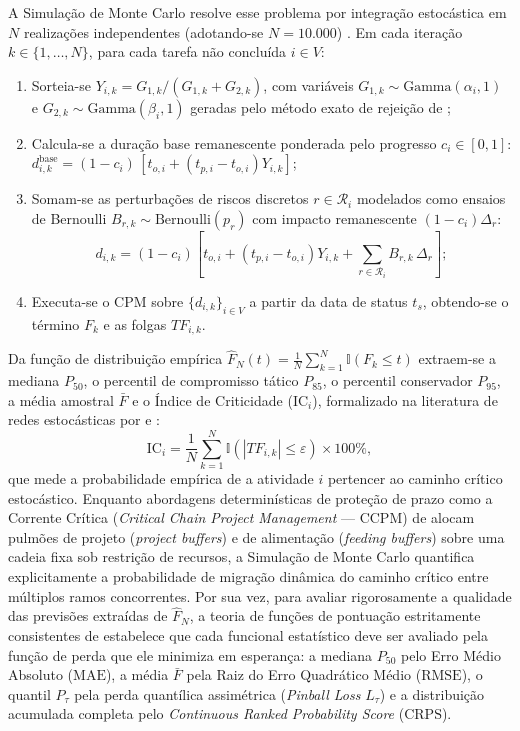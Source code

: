 \documentclass[12pt,openany,oneside,a4paper,english,brazilian,sumario=tradicional]{abntex2}
\newcommand{\IC}{\mathrm{IC}}
\begin{document}
A Simulação de Monte Carlo resolve esse problema por integração estocástica em $N$ realizações independentes (adotando-se $N=10.000$) \cite{vanslyke1963,law2015}. Em cada iteração $k \in \{1,\dots,N\}$, para cada tarefa não concluída $i \in V$:
\begin{enumerate}
  \item Sorteia-se $Y_{i,k} = G_{1,k}/(G_{1,k}+G_{2,k})$, com variáveis $G_{1,k}\sim\mathrm{Gamma}(\alpha_i,1)$ e $G_{2,k}\sim\mathrm{Gamma}(\beta_i,1)$ geradas pelo método exato de rejeição de ;
  \item Calcula-se a duração base remanescente ponderada pelo progresso $c_i \in [0,1]$: $d_{i,k}^{\mathrm{base}} = (1-c_i)\,[t_{o,i} + (t_{p,i}-t_{o,i})Y_{i,k}]$;
  \item Somam-se as perturbações de riscos discretos $r \in \mathcal{R}_i$ modelados como ensaios de Bernoulli $B_{r,k}\sim\mathrm{Bernoulli}(p_r)$ com impacto remanescente $(1-c_i)\Delta_r$:
  \begin{equation}
  d_{i,k} = (1-c_i)\left[t_{o,i} + (t_{p,i}-t_{o,i})Y_{i,k} + \sum_{r\in\mathcal{R}_i} B_{r,k}\,\Delta_r\right];
  \end{equation}
  \item Executa-se o CPM sobre $\{d_{i,k}\}_{i\in V}$ a partir da data de status $t_s$, obtendo-se o término $F_k$ e as folgas $TF_{i,k}$.
\end{enumerate}

Da função de distribuição empírica $\hat{F}_N(t) = \frac{1}{N}\sum_{k=1}^N \mathbb{I}(F_k \le t)$ extraem-se a mediana $P_{50}$, o percentil de compromisso tático $P_{85}$, o percentil conservador $P_{95}$, a média amostral $\bar{F}$ e o Índice de Criticidade ($\IC_i$), formalizado na literatura de redes estocásticas por  e :
\begin{equation}
\IC_i=\frac{1}{N}\sum_{k=1}^{N}\mathbb{I}\left(|TF_{i,k}| \le \varepsilon\right)\times 100\%,
\end{equation}
que mede a probabilidade empírica de a atividade $i$ pertencer ao caminho crítico estocástico. Enquanto abordagens determinísticas de proteção de prazo como a Corrente Crítica (\textit{Critical Chain Project Management} --- CCPM) de  alocam pulmões de projeto (\textit{project buffers}) e de alimentação (\textit{feeding buffers}) sobre uma cadeia fixa sob restrição de recursos, a Simulação de Monte Carlo quantifica explicitamente a probabilidade de migração dinâmica do caminho crítico entre múltiplos ramos concorrentes. Por sua vez, para avaliar rigorosamente a qualidade das previsões extraídas de $\hat{F}_N$, a teoria de funções de pontuação estritamente consistentes de  estabelece que cada funcional estatístico deve ser avaliado pela função de perda que ele minimiza em esperança: a mediana $P_{50}$ pelo Erro Médio Absoluto ($\mathrm{MAE}$), a média $\bar{F}$ pela Raiz do Erro Quadrático Médio ($\mathrm{RMSE}$), o quantil $P_{\tau}$ pela perda quantílica assimétrica (\textit{Pinball Loss} $L_{\tau}$) e a distribuição acumulada completa pelo \textit{Continuous Ranked Probability Score} ($\mathrm{CRPS}$).
\end{document}
